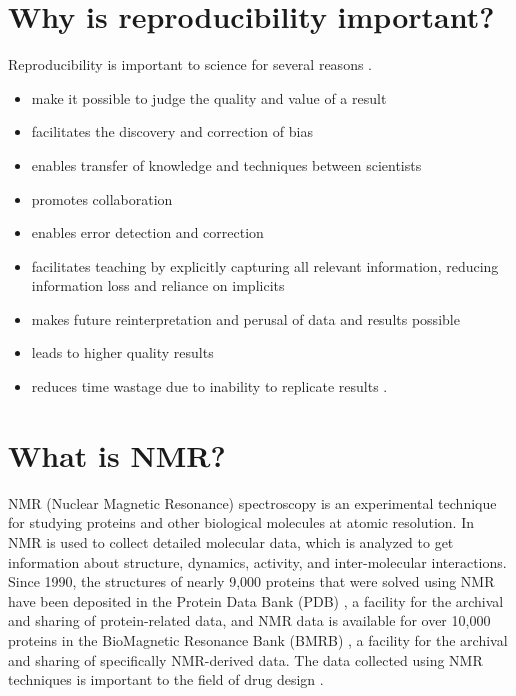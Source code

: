 \section{Why is reproducibility important?}
Reproducibility is important to science for several reasons \cite{borgman2012conundrum}.
\begin{itemize}
  \item make it possible to judge the quality and value of a result
  \item facilitates the discovery and correction of bias
  \item enables transfer of knowledge and techniques between scientists \cite{rung2013reuse}
  \item promotes collaboration
  \item enables error detection and correction
  \item facilitates teaching by explicitly capturing all relevant information,
        reducing information loss and reliance on implicits
  \item makes future reinterpretation and perusal of data and results possible
  \item leads to higher quality results
  \item reduces time wastage due to inability to replicate results 
        \cite{ioannidis2005most, mullard2011reliability, prinz2011reproducibility, begley2012drug}. 
\end{itemize}



\section{What is NMR?}
NMR (Nuclear Magnetic Resonance) spectroscopy is an experimental technique for 
studying proteins and other biological molecules at atomic resolution.  In 
NMR is used to collect detailed molecular data, which 
is analyzed to get information about structure, dynamics,  
activity, and inter-molecular interactions.  
Since 1990, the structures of nearly 9,000 
proteins that were solved using NMR have been deposited in the Protein Data 
Bank (PDB) \cite{pdb}, a facility for the archival and sharing of protein-related 
data, and NMR data is available for over 10,000 proteins in the BioMagnetic 
Resonance Bank (BMRB) \cite{bmrb}, a facility for the archival and sharing of 
specifically NMR-derived data.  The data collected using NMR techniques is 
important to the field of drug design 
\cite{stockman2002drugs, moore2003leveraging, reckel2011proteorhodopsin}.



